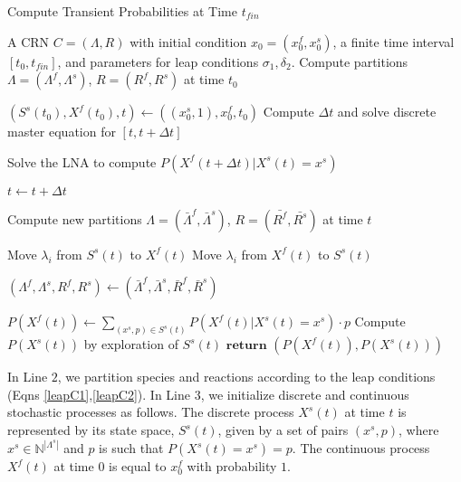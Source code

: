 \documentclass{llncs}
\begin{document}
{\footnotesize\begin{algorithm}[t]
\caption{Compute Transient Probabilities at Time $t_{fin}$}\label{GeneralMix}
\renewcommand{\baselinestretch}{.75}
\begin{algorithmic}[1]
\Require A CRN $C=(\Lambda,R)$ with initial condition $x_0=(x^f_0,x^s_0)$, a finite time interval $[t_0,t_{fin}]$, and parameters for leap conditions $\sigma_1,\delta_2.$
\State Compute partitions $\Lambda=(\Lambda^f,\Lambda^s)$, $R=(R^f,R^s)$ at time $t_0$

\State $(S^s(t_0),X^f(t_0),t) \gets ((x^s_0,1),x^f_0,t_0)$ %
\State Compute $\Delta t$ and solve discrete master equation for $[t,t+\Delta t]$

\State Solve the LNA to compute $P(X^f(t+\Delta t)|X^s(t)=x^s)$ 

\EndFor
\State $t \gets t+\Delta t$

\State Compute new partitions $\Lambda=(\bar{\Lambda}^f,\bar{\Lambda}^s)$, $R=(\bar{R^f},\bar{R^s})$ at time $t$

    \State Move $\lambda_i$ from $S^s(t)$ to $X^f(t)$
\EndIf
{}
    \State Move $\lambda_i$ from $X^f(t)$ to $S^s(t)$
\EndIf

\EndFor

\State $({\Lambda}^f,{\Lambda}^s,{R}^f,{R}^s) \gets (\bar{\Lambda}^f,\bar{\Lambda}^s,\bar{R}^f,\bar{R}^s)$

\EndWhile

\State $P(X^f(t))\gets \sum_{(x^s,p)\in S^s(t)} P(X^f(t)|X^s(t)=x^s)\cdot p$ %
\State Compute $P(X^s(t))$ by exploration of $S^s(t)$
\State $\textbf{return } (P(X^f(t)),P(X^s(t)))$ 
\EndFunction
\end{algorithmic}
\end{algorithm}}
In Line $2$, we partition species and reactions according to the leap conditions (Eqns \eqref{leapC1},\eqref{leapC2}). %
In Line $3$, we initialize discrete and continuous stochastic processes as follows. The discrete process $X^s(t)$ at time $t$ is represented by its state space, $S^s(t)$, given by a set of pairs $(x^s,p)$, where $x^s\in \mathbb{N}^{|\Lambda^s|}$ and $p$ is such that $P(X^s(t)=x^s)=p$. The continuous process $X^f(t)$ at time $0$ is equal to $x^f_0$ with probability $1$.   
\end{document}

